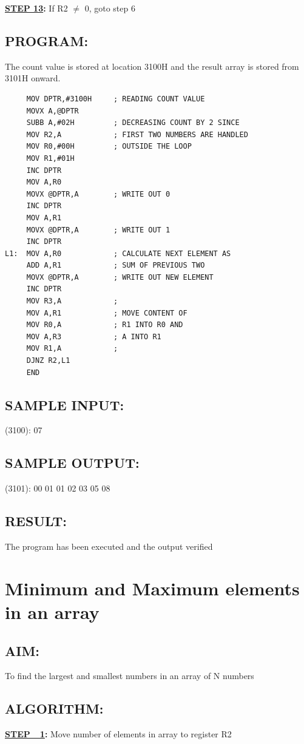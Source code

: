 \documentclass[a4paper,28pt,twoside,openright]{report}
\begin{document}
\textbf{\underline{STEP 13}:} If R2 $\neq$ 0, goto step 6 
\newpage
\section*{PROGRAM:}
The count value is stored at location 3100H and the result array is stored from 3101H onward.
\newline
\begin{lstlisting}
     MOV DPTR,#3100H     ; READING COUNT VALUE
     MOVX A,@DPTR
     SUBB A,#02H         ; DECREASING COUNT BY 2 SINCE
     MOV R2,A            ; FIRST TWO NUMBERS ARE HANDLED
     MOV R0,#00H         ; OUTSIDE THE LOOP
     MOV R1,#01H
     INC DPTR
     MOV A,R0
     MOVX @DPTR,A        ; WRITE OUT 0
     INC DPTR
     MOV A,R1
     MOVX @DPTR,A        ; WRITE OUT 1
     INC DPTR
L1:  MOV A,R0            ; CALCULATE NEXT ELEMENT AS
     ADD A,R1            ; SUM OF PREVIOUS TWO
     MOVX @DPTR,A        ; WRITE OUT NEW ELEMENT
     INC DPTR
     MOV R3,A            ;
     MOV A,R1            ; MOVE CONTENT OF
     MOV R0,A            ; R1 INTO R0 AND
     MOV A,R3            ; A INTO R1
     MOV R1,A            ;
     DJNZ R2,L1
     END
\end{lstlisting}

\section*{SAMPLE INPUT:}
(3100): 07
\section*{SAMPLE OUTPUT:}
(3101): 00 01 01 02 03 05 08
\section*{RESULT:}
The program has been executed and the output verified
%
%
%
\chapter{Minimum and Maximum elements in an array}
%
%
\section*{AIM:}To find the largest and smallest numbers in an array of N numbers

\section*{ALGORITHM:}
\textbf{\underline{STEP\ \ 1}:} Move number of elements in array to register R2
\end{document}
